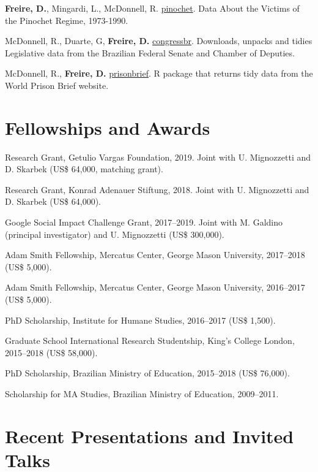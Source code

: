 \documentclass[a4paper]{article}
\renewenvironment{itemize}{
	\begin{list}{}{
			\setlength{\leftmargin}{1.5em}
		}
		}{
	\end{list}
}
\begin{document}
	\begin{itemize}
		\item \textbf{Freire, D.}, Mingardi, L., McDonnell, R. \href{http://danilofreire.github.io/pinochet}{pinochet}. Data About the Victims of the Pinochet Regime, 1973-1990.
		\item McDonnell, R., Duarte, G, \textbf{Freire, D.} \href{https://github.com/RobertMyles/congressbr}{congressbr}. Downloads, unpacks and tidies Legislative data from the Brazilian Federal Senate and Chamber of Deputies.
		\item McDonnell, R., \textbf{Freire, D.} \href{http://danilofreire.github.io/prisonbrief}{prisonbrief}. R package that returns tidy data from the World Prison Brief website.
	\end{itemize}

	\section*{Fellowships and Awards}

  \begin{itemize}
		\item Research Grant, Getulio Vargas Foundation, 2019. Joint with U. Mignozzetti and D. Skarbek (US\$ 64,000, matching grant).
		\item Research Grant, Konrad Adenauer Stiftung, 2018. Joint with U. Mignozzetti and D. Skarbek (US\$ 64,000).
		\item Google Social Impact Challenge Grant, 2017--2019. Joint with M. Galdino (principal investigator) and U. Mignozzetti (US\$ 300,000).
  	\item Adam Smith Fellowship, Mercatus Center, George Mason University, 2017--2018 (US\$ 5,000).
		\item Adam Smith Fellowship, Mercatus Center, George Mason University, 2016--2017 (US\$ 5,000).
		\item PhD Scholarship, Institute for Humane Studies, 2016--2017 (US\$ 1,500).
		\item Graduate School International Research Studentship, King's College London, 2015--2018 (US\$ 58,000).
		\item PhD Scholarship, Brazilian Ministry of Education, 2015--2018 (US\$ 76,000).
		\item Scholarship for MA Studies, Brazilian Ministry of Education, 2009--2011.
	\end{itemize}

	\section*{Recent Presentations and Invited Talks}
\end{document}
